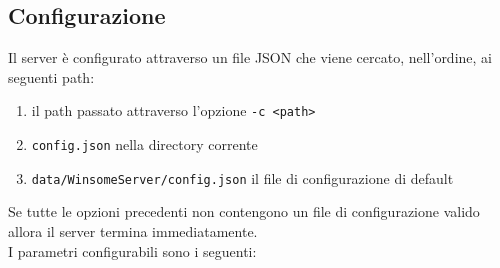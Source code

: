 \subsection{Configurazione}
Il server è configurato attraverso un file JSON che viene cercato, nell'ordine, ai seguenti path:
\begin{enumerate}
	\item il path passato attraverso l'opzione \verb|-c <path>|
	\item \verb|config.json| nella directory corrente
	\item \verb|data/WinsomeServer/config.json| il file di configurazione di default
\end{enumerate}
Se tutte le opzioni precedenti non contengono un file di configurazione valido allora il server termina immediatamente.\\
I parametri configurabili sono i seguenti:
